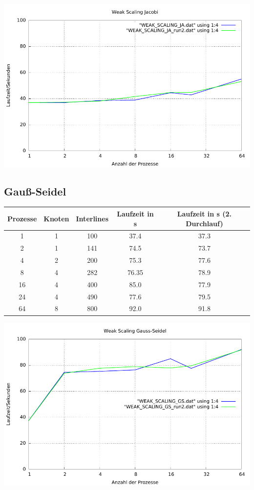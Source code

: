 \documentclass[a4paper]{article}
\begin{document}
\includegraphics[scale=0.8]{img/WEAK_SCALING_JA_laufzeit.pdf}
\subsection{Gauß-Seidel}
\begin{tabular}{|c|c|c|c|c|}
\hline 
Prozesse & Knoten & Interlines & Laufzeit in s & Laufzeit in s (2. Durchlauf) \\ 
\hline 
1 & 1 & 100 & 37.4 & 37.3 \\ 
\hline 
2 & 1 & 141 & 74.5 & 73.7 \\ 
\hline 
4 & 2 & 200 & 75.3 & 77.6 \\ 
\hline 
8 & 4 & 282 & 76.35 & 78.9 \\ 
\hline 
16 & 4 & 400 & 85.0 & 77.9 \\ 
\hline 
24 & 4 & 490 & 77.6 & 79.5 \\ 
\hline 
64 & 8 & 800 & 92.0 & 91.8 \\ 
\hline 
\end{tabular} 

\includegraphics[scale=0.8]{img/WEAK_SCALING_GS_laufzeit.pdf}
\end{document}
